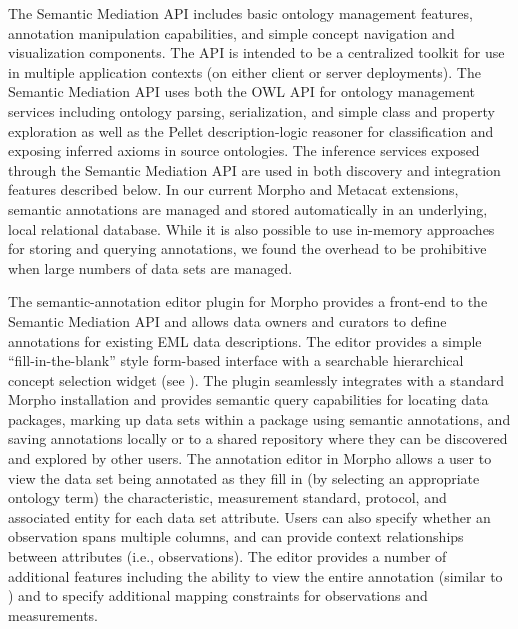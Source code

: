  The Semantic Mediation API
includes basic ontology management features, annotation manipulation
capabilities, and simple concept navigation and visualization
components. The API is intended to be a centralized toolkit for use in
multiple application contexts (on either client or server
deployments).  The Semantic Mediation API uses both the OWL API
\cite{owlapi} for ontology management services including ontology 
parsing, serialization, and simple class and property exploration as
well as the Pellet description-logic reasoner \cite{pellet} for
classification and exposing inferred axioms in source ontologies. The
inference services exposed through the Semantic Mediation API are used
in both discovery and integration features described below.
In our current Morpho and Metacat extensions, semantic annotations are
managed and stored automatically in an underlying, local relational
database. While it is also possible to use in-memory approaches for
storing and querying annotations, we found the overhead to be
prohibitive when large numbers of data sets are managed.




  The semantic-annotation editor
plugin for Morpho provides a front-end to the Semantic Mediation API
and allows data owners and curators to define annotations for existing EML data 
descriptions. The editor provides a simple ``fill-in-the-blank'' style
form-based interface with a searchable hierarchical concept selection
widget (see ). The plugin seamlessly
integrates with a standard Morpho installation and provides semantic
query capabilities for locating data packages, marking up data sets within a 
package using semantic annotations, and saving annotations locally or
to a shared repository where they can be discovered and explored by
other users. The annotation editor in Morpho allows a user to view the
data set being annotated as they fill in (by selecting an appropriate
ontology term) the characteristic, measurement standard, protocol, and
associated entity for each data set attribute. Users can also specify
whether an observation spans multiple columns, and can provide context
relationships between attributes (i.e., observations). The editor
provides a number of additional features including the ability to
view the entire annotation (similar to )
and to specify additional mapping constraints for observations and
measurements.

